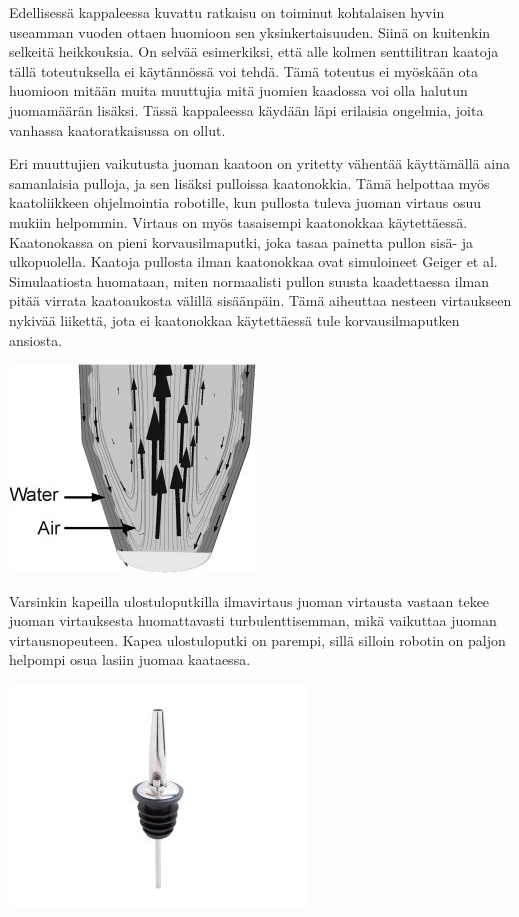 Edellisessä kappaleessa kuvattu ratkaisu on toiminut kohtalaisen hyvin useamman vuoden ottaen huomioon sen yksinkertaisuuden. Siinä on kuitenkin selkeitä heikkouksia. On selvää esimerkiksi, että alle kolmen senttilitran kaatoja tällä toteutuksella ei käytännössä voi tehdä. Tämä toteutus ei myöskään ota huomioon mitään muita muuttujia mitä juomien kaadossa voi olla halutun juomamäärän lisäksi. Tässä kappaleessa käydään läpi erilaisia ongelmia, joita vanhassa kaatoratkaisussa on ollut.

Eri muuttujien vaikutusta juoman kaatoon on yritetty vähentää käyttämällä aina samanlaisia pulloja, ja sen lisäksi pulloissa kaatonokkia. Tämä helpottaa myös kaatoliikkeen ohjelmointia robotille, kun pullosta tuleva juoman virtaus osuu mukiin helpommin. Virtaus on myös tasaisempi kaatonokkaa käytettäessä. Kaatonokassa on pieni korvausilmaputki, joka tasaa painetta pullon sisä- ja ulkopuolella. Kaatoja pullosta ilman kaatonokkaa ovat simuloineet Geiger et al. Simulaatiosta huomataan, miten normaalisti pullon suusta kaadettaessa ilman pitää virrata kaatoaukosta välillä sisäänpäin. Tämä aiheuttaa nesteen virtaukseen nykivää liikettä, jota ei kaatonokkaa käytettäessä tule korvausilmaputken ansiosta.

\includegraphics{img/Geiger et al. juoman virtaus.jpg}

Varsinkin kapeilla ulostuloputkilla ilmavirtaus juoman virtausta vastaan tekee juoman virtauksesta huomattavasti turbulenttisemman, mikä vaikuttaa juoman virtausnopeuteen. \cite{Geiger2012} Kapea ulostuloputki on parempi, sillä silloin robotin on paljon helpompi osua lasiin juomaa kaataessa.

\includegraphics{img/kaatonokka_nettikauppa.jpg}


